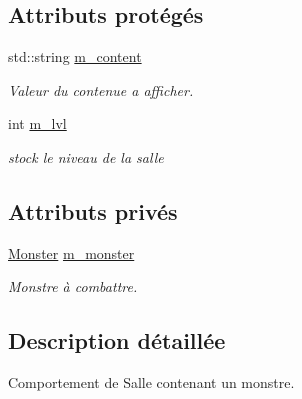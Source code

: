 \subsection*{Attributs protégés}
\begin{DoxyCompactItemize}
\item 
\hypertarget{class_room_comportement_a48186371372d14465faffc7734e89fdc}{std\-::string \hyperlink{class_room_comportement_a48186371372d14465faffc7734e89fdc}{m\-\_\-content}}\label{class_room_comportement_a48186371372d14465faffc7734e89fdc}

\begin{DoxyCompactList}\small\item\em Valeur du contenue a afficher. \end{DoxyCompactList}\item 
\hypertarget{class_room_comportement_acfc0d0c3c7dbcd88235e8c615f7290a3}{int \hyperlink{class_room_comportement_acfc0d0c3c7dbcd88235e8c615f7290a3}{m\-\_\-lvl}}\label{class_room_comportement_acfc0d0c3c7dbcd88235e8c615f7290a3}

\begin{DoxyCompactList}\small\item\em stock le niveau de la salle \end{DoxyCompactList}\end{DoxyCompactItemize}
\subsection*{Attributs privés}
\begin{DoxyCompactItemize}
\item 
\hypertarget{class_monster_room_a3811824f29760f700f945a49b278c3d7}{\hyperlink{class_monster}{Monster} \hyperlink{class_monster_room_a3811824f29760f700f945a49b278c3d7}{m\-\_\-monster}}\label{class_monster_room_a3811824f29760f700f945a49b278c3d7}

\begin{DoxyCompactList}\small\item\em Monstre à combattre. \end{DoxyCompactList}\end{DoxyCompactItemize}


\subsection{Description détaillée}
Comportement de Salle contenant un monstre. 

